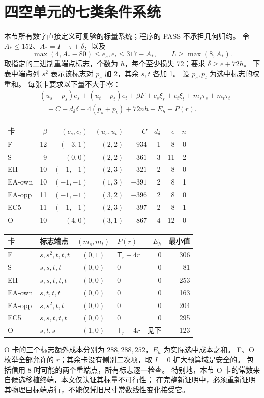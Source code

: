 \documentclass[11pt,a4paper]{article}
\newcommand{\A}{A_*}
\newcommand{\T}{\mathsf T}
\begin{document}
\section{四空单元的七类条件系统}
本节所有数字直接定义可复验的标量系统；程序的 PASS 不承担几何归约。
令 $\A\le152$、$\A=I+\tau+\delta$，以及
\[
\max(4,\A-80)\le e_s,e_t\le317-\A,\qquad L\ge\max(8,\A).
\]
取指定的二进制重端点标志，个数为 $h$，每个至少损失 72；要求 $\delta\ge e+72h$。
下表中端点列 $s^2$ 表示该标志对 $p_s$ 加 2，其余 $s,t$ 各加 1。
设 $p_s,p_t$ 为选中标志的权重和。
每张卡要求以下量不大于零：
\begin{equation}\label{eq:z4-system}
\begin{split}
 &(u_s-p_s)e_s+(u_t-p_t)e_t+\beta F
 +c_s\xi_s+c_t\xi_t+m_s\tau_s+m_t\tau_t\\
 &\quad+C-d_\delta\delta+4(p_s+p_t)+72n h+E_h+P(r).
\end{split}
\end{equation}
\begin{center}\small\begin{tabular}{lrrrrrrr}\toprule
卡&$\beta$&$(c_s,c_t)$&$(u_s,u_t)$&$C$&$d_\delta$&$e$&$n$\\\midrule
F&12&$(-3,1)$&$(2,2)$&$-934$&1&8&0\\
S&9&$(0,0)$&$(2,2)$&$-361$&3&11&2\\
EH&10&$(-1,-1)$&$(2,3)$&$-321$&2&8&0\\
EA-own&10&$(-1,-1)$&$(1,3)$&$-391$&2&8&1\\
EA-opp&11&$(-1,-1)$&$(3,2)$&$-396$&2&8&0\\
EC5&11&$(-1,-1)$&$(2,3)$&$-397$&2&8&1\\
O&10&$(4,0)$&$(3,1)$&$-867$&4&12&0\\\bottomrule
\end{tabular}\end{center}
\begin{center}\small\begin{tabular}{llclrr}\toprule
卡&标志端点&$(m_s,m_t)$&$P(r)$&$E_h$&最小值\\\midrule
F&$s,s^2,t,t,t$&$(0,1)$&$\T_r+4r$&0&306\\
S&$s,s,t,t$&$(0,0)$&0&0&81\\
EH&$s,s,t,t,t$&$(0,0)$&0&0&253\\
EA-own&$s,t,t,t$&$(0,0)$&0&0&163\\
EA-opp&$s,s^2,t,t$&$(0,0)$&0&0&204\\
EC5&$s,s,t,t,t$&$(0,0)$&0&0&295\\
O&$s,t,s$&$(1,0)$&$\T_r+4r$&见下&123\\\bottomrule
\end{tabular}\end{center}
O 卡的三个标志额外成本分别为 $288,288,252$，$E_h$ 为实际选中成本之和。
F、O 枚举全部允许的 $r$；其余卡没有侧别二次项，取 $I=0$ 扩大预算域是安全的。
包括信用 8 时可能的两个重端点，所有标志逐一检查。
特别地，本节 O 卡的常数来自候选移植终端，本文仅认证其标量不可行性；
在完整新证明中，必须重新证明其物理目标端点行，不能仅凭旧尺寸常数线性变化接受它。
\end{document}
